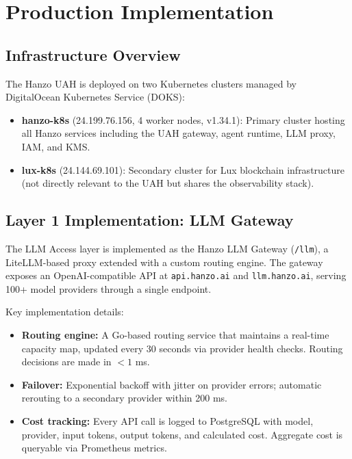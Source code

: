 \documentclass[11pt]{article}
\begin{document}
\section{Production Implementation}
\label{sec:implementation}

\subsection{Infrastructure Overview}

The Hanzo UAH is deployed on two Kubernetes clusters managed by DigitalOcean
Kubernetes Service (DOKS):

\begin{itemize}[leftmargin=1.5em]
    \item \textbf{hanzo-k8s} (24.199.76.156, 4 worker nodes, v1.34.1):
          Primary cluster hosting all Hanzo services including the UAH
          gateway, agent runtime, LLM proxy, IAM, and KMS.
    \item \textbf{lux-k8s} (24.144.69.101):
          Secondary cluster for Lux blockchain infrastructure (not directly
          relevant to the UAH but shares the observability stack).
\end{itemize}

\subsection{Layer 1 Implementation: LLM Gateway}

The LLM Access layer is implemented as the Hanzo LLM Gateway
(\texttt{/llm}), a LiteLLM-based proxy extended with a custom routing engine.
The gateway exposes an OpenAI-compatible API at \texttt{api.hanzo.ai} and
\texttt{llm.hanzo.ai}, serving 100+ model providers through a single
endpoint.

Key implementation details:
\begin{itemize}[leftmargin=1.5em]
    \item \textbf{Routing engine:} A Go-based routing service that maintains
          a real-time capacity map, updated every 30 seconds via provider
          health checks. Routing decisions are made in $<1$ ms.
    \item \textbf{Failover:} Exponential backoff with jitter on provider
          errors; automatic rerouting to a secondary provider within 200 ms.
    \item \textbf{Cost tracking:} Every API call is logged to PostgreSQL with
          model, provider, input tokens, output tokens, and calculated cost.
          Aggregate cost is queryable via Prometheus metrics.
\end{itemize}
\end{document}
